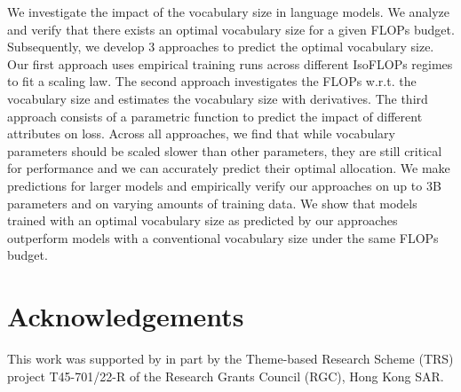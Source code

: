 \documentclass{article}
\begin{document}
We investigate the impact of the vocabulary size in language models. We analyze and verify that there exists an optimal vocabulary size for a given FLOPs budget. Subsequently, we develop 3 approaches to predict the optimal vocabulary size.
Our first approach uses empirical training runs across different IsoFLOPs regimes to fit a scaling law. The second approach investigates the FLOPs w.r.t. the vocabulary size and estimates the vocabulary size with derivatives. The third approach consists of a parametric function to predict the impact of different attributes on loss.
Across all approaches, we find that while vocabulary parameters should be scaled slower than other parameters, they are still critical for performance and we can accurately predict their optimal allocation. We make predictions for larger models and empirically verify our approaches on up to 3B parameters and on varying amounts of training data. We show that models trained with an optimal vocabulary size as predicted by our approaches outperform models with a conventional vocabulary size under the same FLOPs budget.

\section*{Acknowledgements}
This work was supported by in part by the Theme-based Research Scheme (TRS) project T45-701/22-R of the Research Grants Council (RGC), Hong Kong SAR.




\newpage



\end{document}
